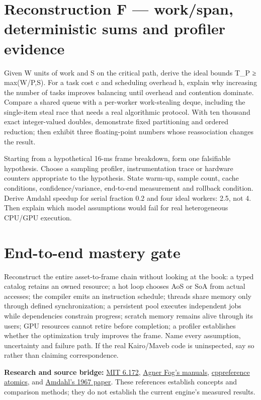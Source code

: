 \section{Reconstruction F --- work/span, deterministic sums and profiler evidence}\label{appendix-2587680a4fe3-reconstruction-f-workspan-deterministic-sums-and-profiler-evidence}

Given W units of work and S on the critical path, derive the ideal bounds T\_P ≥ max(W/P,S). For a task cost c and scheduling overhead h, explain why increasing the number of tasks improves balancing until overhead and contention dominate. Compare a shared queue with a per-worker work-stealing deque, including the single-item steal race that needs a real algorithmic protocol. With ten thousand exact integer-valued doubles, demonstrate fixed partitioning and ordered reduction; then exhibit three floating-point numbers whose reassociation changes the result.

Starting from a hypothetical 16-ms frame breakdown, form one falsifiable hypothesis. Choose a sampling profiler, instrumentation trace or hardware counters appropriate to the hypothesis. State warm-up, sample count, cache conditions, confidence/variance, end-to-end measurement and rollback condition. Derive Amdahl speedup for serial fraction 0.2 and four ideal workers: 2.5, not 4. Then explain which model assumptions would fail for real heterogeneous CPU/GPU execution.

\section{End-to-end mastery gate}\label{appendix-2587680a4fe3-end-to-end-mastery-gate}

Reconstruct the entire asset-to-frame chain without looking at the book: a typed catalog retains an owned resource; a hot loop chooses AoS or SoA from actual accesses; the compiler emits an instruction schedule; threads share memory only through defined synchronization; a persistent pool executes independent jobs while dependencies constrain progress; scratch memory remains alive through its users; GPU resources cannot retire before completion; a profiler establishes whether the optimization truly improves the frame. Name every assumption, uncertainty and failure path. If the real Kairo/Maveb code is uninspected, say so rather than claiming correspondence.

\textbf{Research and source bridge:} \href{https://ocw.mit.edu/courses/6-172-performance-engineering-of-software-systems-fall-2018/video_galleries/lecture-videos/}{MIT 6.172}, \href{https://www.agner.org/optimize/}{Agner Fog's manuals}, \href{https://en.cppreference.com/w/cpp/atomic/memory_order}{cppreference atomics}, and \href{https://doi.org/10.1145/1465482.1465560}{Amdahl's 1967 paper}. These references establish concepts and comparison methods; they do not establish the current engine's measured results.

